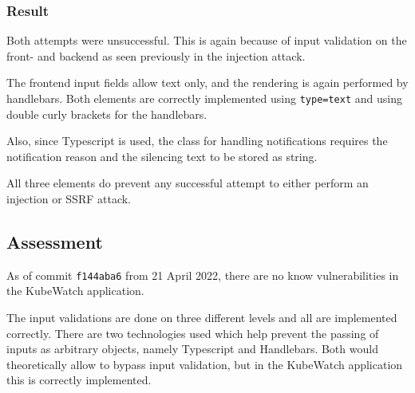 \subsubsection{Result}
Both attempts were unsuccessful. This is again because of input validation on the front- and backend as seen previously in the injection attack.

The frontend input fields allow text only, and the rendering is again performed by handlebars. Both elements are correctly implemented using \lstinline "type=text" and using double curly brackets for the handlebars.

Also, since Typescript is used, the class for handling notifications requires the notification reason and the silencing text to be stored as string.

All three elements do prevent any successful attempt to either perform an injection or SSRF attack.


\subsection{Assessment}
As of commit \lstinline "f144aba6" from 21 April 2022, there are no know vulnerabilities in the KubeWatch application.

The input validations are done on three different levels and all are implemented correctly. There are two technologies used which help prevent the passing of inputs as arbitrary objects, namely Typescript and Handlebars. Both would theoretically allow to bypass input validation, but in the KubeWatch application this is correctly implemented.


